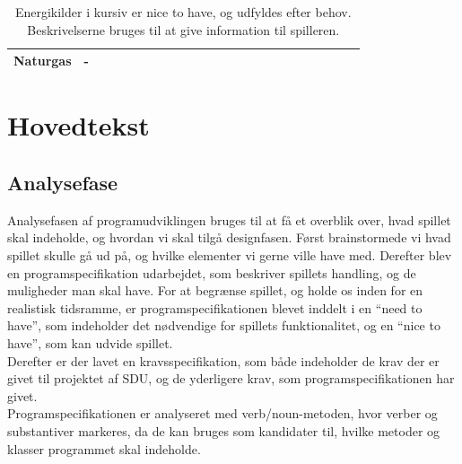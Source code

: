 \documentclass[a4paper,12pt]{report}
\begin{document}
\begin{table}[H]
\begin{tabular}{|p{0.2\linewidth}|p{0.8\linewidth}|}
Naturgas             & -                                                                                                                                                                                                                                                                                                                                                                                                                                                                                                                                                                            \\ \hline
\end{tabular}
\caption{Energikilder i kursiv er nice to have, og udfyldes efter behov. Beskrivelserne bruges til at give information til spilleren.}
\label{tab:energibeskrivelser}
\end{table}

\section{Hovedtekst}
\subsection{Analysefase}
Analysefasen af programudviklingen bruges til at få et overblik over, hvad spillet skal indeholde, og hvordan vi skal tilgå designfasen. Først brainstormede vi hvad spillet skulle gå ud på, og hvilke elementer vi gerne ville have med. Derefter blev en programspecifikation udarbejdet, som beskriver spillets handling, og de muligheder man skal have. For at begrænse spillet, og holde os inden for en realistisk tidsramme, er programspecifikationen blevet inddelt i  en “need to have”, som indeholder det nødvendige for spillets funktionalitet,  og en “nice to have”, som kan udvide spillet.\\
Derefter er der lavet en kravsspecifikation, som både indeholder de krav der er givet til projektet af SDU, og de yderligere krav, som programspecifikationen har givet. \\
Programspecifikationen er analyseret med verb/noun-metoden, hvor verber og substantiver markeres, da de kan bruges som kandidater til, hvilke metoder og klasser programmet skal indeholde.
\end{document}
